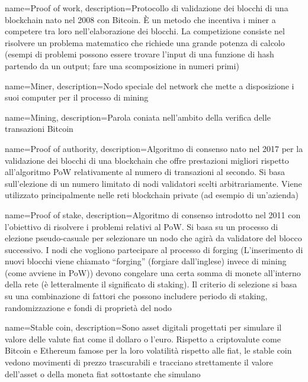{
	name={Proof of work},
	description={Protocollo di validazione dei blocchi di una blockchain\glo{} nato nel 2008 con Bitcoin. È un metodo che incentiva i miner\glo{} a competere tra loro nell'elaborazione dei blocchi. La competizione consiste nel risolvere un problema matematico che richiede una grande potenza di calcolo (esempi di problemi possono essere trovare l'input di una funzione di hash partendo da un output; fare una scomposizione in numeri primi)}
}

{
	name={Miner},
	description={Nodo speciale del network che mette a disposizione i suoi computer per il processo di mining\glo}
}

{
	name={Mining},
	description={Parola coniata nell'ambito della verifica delle transazioni Bitcoin}
}

{
	name={Proof of authority},
	description={Algoritmo di consenso nato nel 2017 per la validazione dei blocchi di una blockchain\glo{} che offre prestazioni migliori rispetto all'algoritmo PoW relativamente al numero di transazioni al secondo. Si basa sull'elezione di un numero limitato di nodi validatori scelti arbitrariamente. Viene utilizzato principalmente nelle reti blockchain\glo{} private (ad esempio di un'azienda)}
}

{
	name={Proof of stake},
	description={Algoritmo di consenso introdotto nel 2011 con l'obiettivo di risolvere i problemi relativi al PoW. Si basa su un processo di elezione pseudo-casuale per selezionare un nodo che agirà da validatore del blocco successivo.  I nodi che vogliono partecipare al processo di forging (L'inserimento di nuovi blocchi viene chiamato “forging” (forgiare dall'inglese) invece di mining (come avviene in PoW)) devono congelare una certa somma di monete all'interno della rete (è letteralmente il significato di staking). Il criterio di selezione si basa su una combinazione di fattori che possono includere periodo di staking, randomizzazione e fondi di proprietà del nodo}
}

{
	name={Stable coin},
	description={Sono asset digitali progettati per simulare il valore delle valute fiat come il dollaro o l'euro. Rispetto a criptovalute\glo{} come Bitcoin e Ethereum famose per la loro volatilità rispetto alle fiat, le stable coin vedono movimenti di prezzo trascurabili e tracciano strettamente il valore dell'asset o della moneta fiat sottostante che simulano}
}


